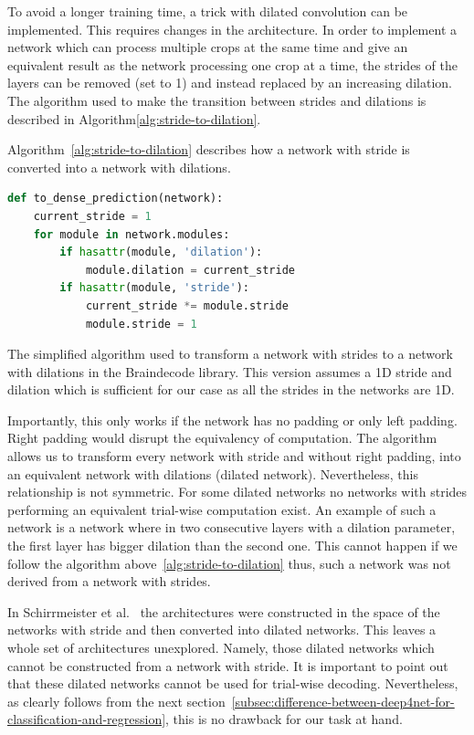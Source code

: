 To avoid a longer training time, a trick with dilated convolution can be implemented.
This requires changes in the architecture.
In order to implement a network which can process multiple crops at the same time and give an equivalent result as the network processing one crop at a time, the strides of the layers can be removed (set to 1) and instead replaced by an increasing dilation.
The algorithm used to make the transition between strides and dilations is described in Algorithm\ref{alg:stride-to-dilation}.

Algorithm~\ref{alg:stride-to-dilation} describes how a network with stride is converted into a network with dilations.\\
\begin{algorithm}
\begin{lstlisting}[language=Python,label={lst:lstlisting}]
def to_dense_prediction(network):
	current_stride = 1
	for module in network.modules:
		if hasattr(module, 'dilation'):
			module.dilation = current_stride
		if hasattr(module, 'stride'):
			current_stride *= module.stride
			module.stride = 1
\end{lstlisting}
\caption{The simplified algorithm used to transform a network with strides to a network with dilations in the Braindecode library.
This version assumes a 1D stride and dilation which is sufficient for our case as all the strides in the networks are 1D.
}
\label{alg:stride-to-dilation}
\end{algorithm}

Importantly, this only works if the network has no padding or only left padding.
Right padding would disrupt the equivalency of computation.
The algorithm allows us to transform every network with stride and without right padding, into an equivalent network with dilations (dilated network).
Nevertheless, this relationship is not symmetric.
For some dilated networks no networks with strides performing an equivalent trial-wise computation exist.
An example of such a network is a network where in two consecutive layers with a dilation parameter, the first layer has bigger dilation than the second one.
This cannot happen if we follow the algorithm above~\ref{alg:stride-to-dilation} thus, such a network was not derived from a network with strides.

In Schirrmeister et al.~\cite{schirrmeister-deep-2017} the architectures were constructed in the space of the networks with stride and then converted into dilated networks.
This leaves a whole set of architectures unexplored.
Namely, those dilated networks which cannot be constructed from a network with stride.
It is important to point out that these dilated networks cannot be used for trial-wise decoding.
Nevertheless, as clearly follows from the next section~\ref{subsec:difference-between-deep4net-for-classification-and-regression}, this is no drawback for our task at hand.

